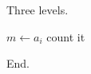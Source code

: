 \documentclass{article}
\begin{document}
Three levels.

\begin{algorithm}[h]
\caption{Nesting}
\begin{algorithmic}[1]
\WHILE{\TRUE}
\STATE $m \gets a_i$
\STATE count it
\ENDIF
\ENDFOR
\ENDWHILE
\end{algorithmic}
\end{algorithm}

End.
\end{document}
